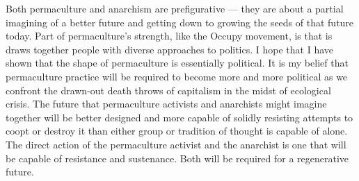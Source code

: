\documentclass[a4paper, 11pt]{article}
\begin{document}
\begin{multicols*}{2}
Both permaculture and anarchism are prefigurative --- they are about a partial imagining of a better future and getting down to growing the seeds of that future today. Part of permaculture's strength, like the Occupy movement, is that is draws together people with diverse approaches to politics.  I hope that I have shown that the shape of permaculture is essentially political.  It is my belief that permaculture practice will be required to become more and more political as we confront the drawn-out death throws of capitalism in the midst of ecological crisis.  The future that permaculture activists and anarchists might imagine together will be better designed and more capable of solidly resisting attempts to coopt or destroy it than either group or tradition of thought is capable of alone.  The direct action of the permaculture activist and the anarchist is one that will be capable of resistance and sustenance.  Both will be required for a regenerative future.

\begin{comment}
\begin{quote}
\begin{quote}
        ``As the capitalist mode of production enters its worst crisis since the 1930s, peasant and small farmers increasingly present a vision of autonomy, diversity, and cooperation that may just be the key elements of a necessary social and economic reorganisation.'' --- \textsc{Bello and Baviera} --- Food Wars in \textsc{Magdoff and Tokar} --- Agriculture and Food Crisis, p49
\end{quote}

\begin{quote}
    ``Nobody is smart enough to plan a society.  You can talk about some of the principles upon which a society should work, and you can set up guidelines as to how to implement them, and how to experiment with them, and there are probably many different ways of doing them.  There's no reason to believe that there's only one right answer; there are lots of different answers, with advantages and disadvantages, and people have to choose between them on the basis of experience, what has happened to others, and so on.  This is true in every area.'' \textsc{Noam Chomsky} in \textsc{Pannekoek}, Workers' Councils p xi
\end{quote}

    ``Ecologically, bourgeois exploitation and manipulation are undermining the very capacity of the earth to sustain advanced forms of life.'' --- \textsc{Bookchin}, PSA p58
\end{quote}


\end{comment}
\end{multicols*}
\end{document}
